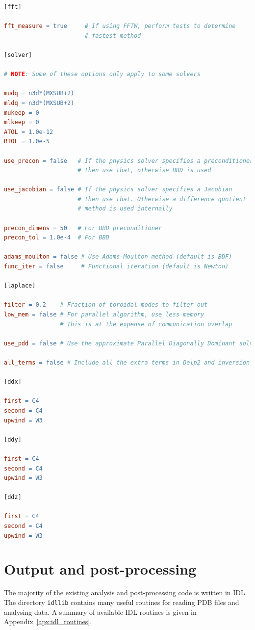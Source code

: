 \documentclass[12pt]{article}
\begin{document}
\begin{lstlisting}[language=make,numbers=none]
[fft]

fft_measure = true     # If using FFTW, perform tests to determine
                       # fastest method

[solver]

# NOTE: Some of these options only apply to some solvers

mudq = n3d*(MXSUB+2)
mldq = n3d*(MXSUB+2)
mukeep = 0
mlkeep = 0
ATOL = 1.0e-12
RTOL = 1.0e-5

use_precon = false   # If the physics solver specifies a preconditioner
                     # then use that, otherwise BBD is used

use_jacobian = false # If the physics solver specifies a Jacobian
                     # then use that. Otherwise a difference quotient
                     # method is used internally

precon_dimens = 50   # For BBD preconditioner
precon_tol = 1.0e-4  # For BBD

adams_moulton = false # Use Adams-Moulton method (default is BDF)
func_iter = false     # Functional iteration (default is Newton)

[laplace]

filter = 0.2    # Fraction of toroidal modes to filter out
low_mem = false # For parallel algorithm, use less memory
                # This is at the expense of communication overlap

use_pdd = false # Use the approximate Parallel Diagonally Dominant solver

all_terms = false # Include all the extra terms in Delp2 and inversion

[ddx]

first = C4
second = C4
upwind = W3

[ddy]

first = C4
second = C4
upwind = W3

[ddz]

first = C4
second = C4
upwind = W3
\end{lstlisting}
%





\section{Output and post-processing}
%
\label{sec:output}
%
The majority of the existing analysis and post-processing code is written in
IDL. The directory \texttt{idllib} contains many useful routines for reading
PDB files and analysing data. A summary of available IDL routines is given in
Appendix~\ref{apx:idl_routines}.
\end{document}
